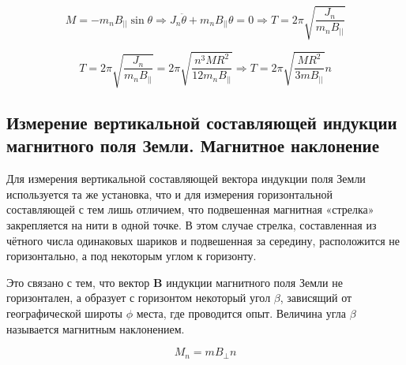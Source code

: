 \documentclass[a4paper, 12pt]{article}%
\begin{document}

\begin{equation}
    M = -m_n B_{||} \sin{\theta} \Rightarrow J_n \ddot{\theta} + m_n B_{||} \theta = 0 \Rightarrow T = 2 \pi \sqrt{\frac{J_n}{m_n B_{||}}}
\end{equation}

\begin{equation}
    T = 2 \pi \sqrt{\frac{J_n}{m_n B_{||}}} = 2 \pi \sqrt{\frac{n^3 M R^2}{12m_n B_{||}}} \Rightarrow T = 2 \pi \sqrt{\frac{M R^2}{3 m B_{||}}} n
\end{equation}

\subsection{Измерение вертикальной составляющей индукции магнитного поля Земли. Магнитное наклонение}

Для измерения вертикальной составляющей вектора индукции поля Земли используется та же установка, что и для измерения горизонтальной составляющей с тем лишь отличием, что подвешенная магнитная «стрелка» закрепляется на нити в одной точке. В этом случае стрелка, составленная из чётного числа одинаковых шариков и подвешенная за середину, расположится не горизонтально, а под некоторым углом к горизонту.

Это связано с тем, что вектор $\textbf{B}$ индукции магнитного поля Земли не горизонтален, а образует с горизонтом
некоторый угол $\beta$, зависящий от географической широты $\phi$ места, где проводится опыт. Величина угла $\beta$ называется магнитным наклонением.


\begin{equation}
    M_n = m B_{\perp} n
\end{equation}
\end{document}
